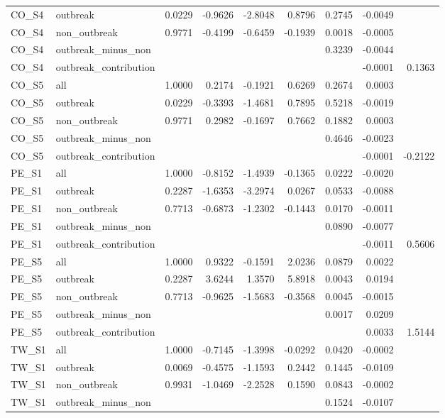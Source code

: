 \begin{tabular}{llrrrrrrr}
CO\_S4 & outbreak & 0.0229 & -0.9626 & -2.8048 & 0.8796 & 0.2745 & -0.0049 &  \\
CO\_S4 & non\_outbreak & 0.9771 & -0.4199 & -0.6459 & -0.1939 & 0.0018 & -0.0005 &  \\
CO\_S4 & outbreak\_minus\_non &  &  &  &  & 0.3239 & -0.0044 &  \\
CO\_S4 & outbreak\_contribution &  &  &  &  &  & -0.0001 & 0.1363 \\
CO\_S5 & all & 1.0000 & 0.2174 & -0.1921 & 0.6269 & 0.2674 & 0.0003 &  \\
CO\_S5 & outbreak & 0.0229 & -0.3393 & -1.4681 & 0.7895 & 0.5218 & -0.0019 &  \\
CO\_S5 & non\_outbreak & 0.9771 & 0.2982 & -0.1697 & 0.7662 & 0.1882 & 0.0003 &  \\
CO\_S5 & outbreak\_minus\_non &  &  &  &  & 0.4646 & -0.0023 &  \\
CO\_S5 & outbreak\_contribution &  &  &  &  &  & -0.0001 & -0.2122 \\
PE\_S1 & all & 1.0000 & -0.8152 & -1.4939 & -0.1365 & 0.0222 & -0.0020 &  \\
PE\_S1 & outbreak & 0.2287 & -1.6353 & -3.2974 & 0.0267 & 0.0533 & -0.0088 &  \\
PE\_S1 & non\_outbreak & 0.7713 & -0.6873 & -1.2302 & -0.1443 & 0.0170 & -0.0011 &  \\
PE\_S1 & outbreak\_minus\_non &  &  &  &  & 0.0890 & -0.0077 &  \\
PE\_S1 & outbreak\_contribution &  &  &  &  &  & -0.0011 & 0.5606 \\
PE\_S5 & all & 1.0000 & 0.9322 & -0.1591 & 2.0236 & 0.0879 & 0.0022 &  \\
PE\_S5 & outbreak & 0.2287 & 3.6244 & 1.3570 & 5.8918 & 0.0043 & 0.0194 &  \\
PE\_S5 & non\_outbreak & 0.7713 & -0.9625 & -1.5683 & -0.3568 & 0.0045 & -0.0015 &  \\
PE\_S5 & outbreak\_minus\_non &  &  &  &  & 0.0017 & 0.0209 &  \\
PE\_S5 & outbreak\_contribution &  &  &  &  &  & 0.0033 & 1.5144 \\
TW\_S1 & all & 1.0000 & -0.7145 & -1.3998 & -0.0292 & 0.0420 & -0.0002 &  \\
TW\_S1 & outbreak & 0.0069 & -0.4575 & -1.1593 & 0.2442 & 0.1445 & -0.0109 &  \\
TW\_S1 & non\_outbreak & 0.9931 & -1.0469 & -2.2528 & 0.1590 & 0.0843 & -0.0002 &  \\
TW\_S1 & outbreak\_minus\_non &  &  &  &  & 0.1524 & -0.0107 &  \\

\end{tabular}
